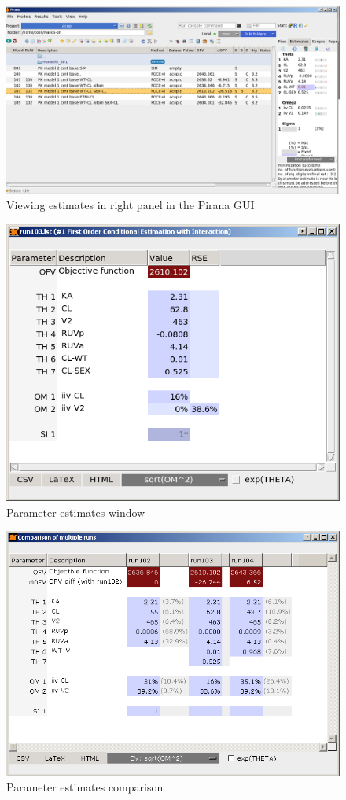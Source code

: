 \begin{figure}[h] \centering
    \includegraphics[scale=.25]{images/report_1.png}
    \caption{Viewing estimates in right panel in the Pirana GUI\label{fig:Fig7}}
\end{figure}

\begin{figure}[h] \centering
    \includegraphics[scale=.35]{images/report_2.png}
    \caption{Parameter estimates window\label{fig:Fig8}}
\end{figure}

\begin{figure}[h] \centering
    \includegraphics[scale=.35]{images/report_4.png}
    \caption{Parameter estimates comparison\label{fig:Fig9}}
\end{figure}

